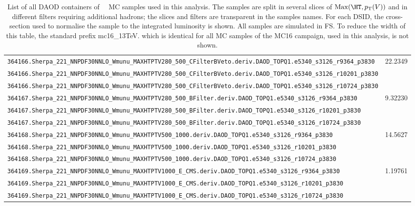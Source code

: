 \begin{table}[htbp]
{\begin{tabular}{l|r}
\verb|364166.Sherpa_221_NNPDF30NNLO_Wmunu_MAXHTPTV280_500_CFilterBVeto.deriv.DAOD_TOPQ1.e5340_s3126_r9364_p3830|  & \multirow{3}{*}{22.2349} \\
\verb|364166.Sherpa_221_NNPDF30NNLO_Wmunu_MAXHTPTV280_500_CFilterBVeto.deriv.DAOD_TOPQ1.e5340_s3126_r10201_p3830| & \\
\verb|364166.Sherpa_221_NNPDF30NNLO_Wmunu_MAXHTPTV280_500_CFilterBVeto.deriv.DAOD_TOPQ1.e5340_s3126_r10724_p3830| & \\ \hline

\verb|364167.Sherpa_221_NNPDF30NNLO_Wmunu_MAXHTPTV280_500_BFilter.deriv.DAOD_TOPQ1.e5340_s3126_r9364_p3830|       & \multirow{3}{*}{9.32230} \\
\verb|364167.Sherpa_221_NNPDF30NNLO_Wmunu_MAXHTPTV280_500_BFilter.deriv.DAOD_TOPQ1.e5340_s3126_r10201_p3830|      & \\
\verb|364167.Sherpa_221_NNPDF30NNLO_Wmunu_MAXHTPTV280_500_BFilter.deriv.DAOD_TOPQ1.e5340_s3126_r10724_p3830|      & \\ \hline

\verb|364168.Sherpa_221_NNPDF30NNLO_Wmunu_MAXHTPTV500_1000.deriv.DAOD_TOPQ1.e5340_s3126_r9364_p3830|              & \multirow{3}{*}{14.5627} \\
\verb|364168.Sherpa_221_NNPDF30NNLO_Wmunu_MAXHTPTV500_1000.deriv.DAOD_TOPQ1.e5340_s3126_r10201_p3830|             & \\
\verb|364168.Sherpa_221_NNPDF30NNLO_Wmunu_MAXHTPTV500_1000.deriv.DAOD_TOPQ1.e5340_s3126_r10724_p3830|             & \\ \hline

\verb|364169.Sherpa_221_NNPDF30NNLO_Wmunu_MAXHTPTV1000_E_CMS.deriv.DAOD_TOPQ1.e5340_s3126_r9364_p3830|            & \multirow{3}{*}{1.19761} \\
\verb|364169.Sherpa_221_NNPDF30NNLO_Wmunu_MAXHTPTV1000_E_CMS.deriv.DAOD_TOPQ1.e5340_s3126_r10201_p3830|           & \\
\verb|364169.Sherpa_221_NNPDF30NNLO_Wmunu_MAXHTPTV1000_E_CMS.deriv.DAOD_TOPQ1.e5340_s3126_r10724_p3830|           & \\ \hline

\bottomrule
\end{tabular}}
  \caption{
    List of all DAOD containers of \Wmunu\ \sherpa\ MC samples used in this analysis.
    The samples are split in several slices of $\mathrm{Max}(\HT,\pT(V))$ and in different filters requiring additional hadrons;
    the slices and filters are transparent in the samples names.
    For each DSID, the cross-section used to normalise the sample to the integrated luminosity is shown.
    All samples are simulated in FS.
    To reduce the width of this table, the standard prefix \textsf{mc16\_13TeV.} which is identical for all MC samples of the MC16 campaign, used in this analysis, is not shown.
  }
  \label{tab:MC_samples_Wmunu}
\end{table}



